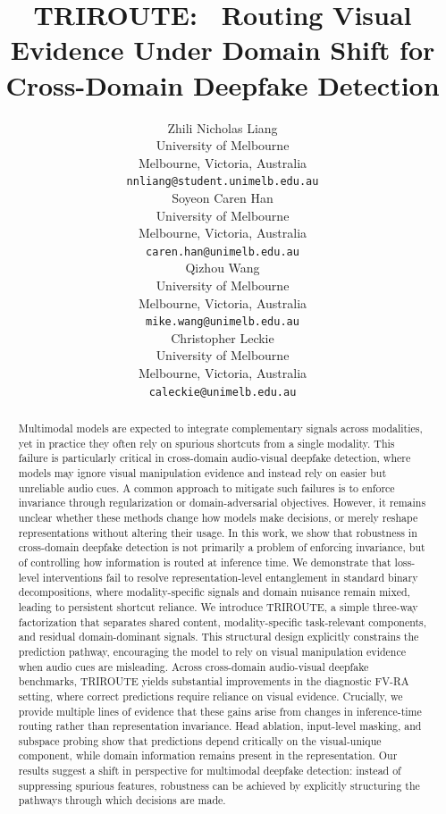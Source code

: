 \documentclass{article}
\title{TRIROUTE:  Routing Visual Evidence Under Domain Shift for Cross-Domain Deepfake Detection}
\author{%
  Zhili Nicholas Liang \\
  University of Melbourne \\
  Melbourne, Victoria, Australia \\
  \texttt{nnliang@student.unimelb.edu.au} \\
  \And
  Soyeon Caren Han \\
  University of Melbourne \\
  Melbourne, Victoria, Australia \\
  \texttt{caren.han@unimelb.edu.au} \\
  \And
  Qizhou Wang \\
  University of Melbourne \\
  Melbourne, Victoria, Australia \\
  \texttt{mike.wang@unimelb.edu.au} \\
  \And
  Christopher Leckie \\
  University of Melbourne \\
  Melbourne, Victoria, Australia \\
  \texttt{caleckie@unimelb.edu.au} \\
}
\begin{document}
\maketitle


\begin{abstract}
Multimodal models are expected to integrate complementary signals across modalities, yet in practice they often rely on spurious shortcuts from a single modality. This failure is particularly critical in cross-domain audio-visual deepfake detection, where models may ignore visual manipulation evidence and instead rely on easier but unreliable audio cues. A common approach to mitigate such failures is to enforce invariance through regularization or domain-adversarial objectives. However, it remains unclear whether these methods change how models make decisions, or merely reshape representations without altering their usage.
In this work, we show that robustness in cross-domain deepfake detection is not primarily a problem of enforcing invariance, but of controlling how information is routed at inference time. We demonstrate that loss-level interventions fail to resolve representation-level entanglement in standard binary decompositions, where modality-specific signals and domain nuisance remain mixed, leading to persistent shortcut reliance.
We introduce TRIROUTE, a simple three-way factorization that separates shared content, modality-specific task-relevant components, and residual domain-dominant signals. This structural design explicitly constrains the prediction pathway, encouraging the model to rely on visual manipulation evidence when audio cues are misleading.
Across cross-domain audio-visual deepfake benchmarks, TRIROUTE yields substantial improvements in the diagnostic FV-RA setting, where correct predictions require reliance on visual evidence. Crucially, we provide multiple lines of evidence that these gains arise from changes in inference-time routing rather than representation invariance. Head ablation, input-level masking, and subspace probing show that predictions depend critically on the visual-unique component, while domain information remains present in the representation.
Our results suggest a shift in perspective for multimodal deepfake detection: instead of suppressing spurious features, robustness can be achieved by explicitly structuring the pathways through which decisions are made.
\end{abstract}
\end{document}
